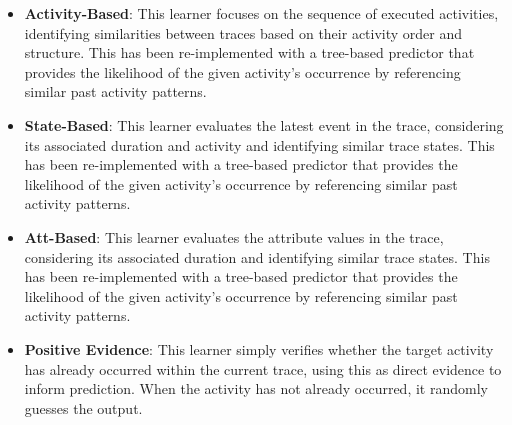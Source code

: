 \documentclass[manuscript,screen,review]{acmart}
\begin{document}
\begin{itemize}
\item \textbf{Activity-Based}: This learner focuses on the sequence of executed activities, identifying similarities between traces based on their activity order and structure. This has been re-implemented with a tree-based predictor that provides the likelihood of the given activity’s occurrence by referencing similar past activity patterns.

\item \textbf{State-Based}: This learner evaluates the latest event in the trace, considering its associated duration and activity and identifying similar trace states. This has been re-implemented with a tree-based predictor that provides the likelihood of the given activity’s occurrence by referencing similar past activity patterns.

\item \textbf{Att-Based}: This learner evaluates the attribute values in the trace, considering its associated duration and identifying similar trace states. This has been re-implemented with a tree-based predictor that provides the likelihood of the given activity’s occurrence by referencing similar past activity patterns.

\item \textbf{Positive Evidence}: This learner simply verifies whether the target activity has already occurred within the current trace, using this as direct evidence to inform prediction. When the activity has not already occurred, it randomly guesses the output.

\end{itemize}

\end{document}
